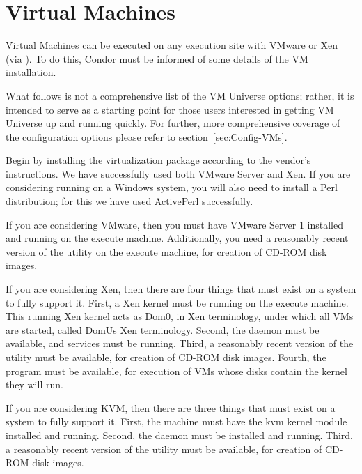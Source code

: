 \section{\label{sec:vm-install}Virtual Machines}


Virtual Machines can be executed on any execution site with VMware or Xen
(via ).  To do this, Condor must be informed of some details 
of the VM installation.

What follows is not a comprehensive list of the VM Universe options; rather,
it is intended to serve as a starting point for those users interested in
getting VM Universe up and running quickly.  For further, more comprehensive 
coverage of the configuration options please refer to 
section~\ref{sec:Config-VMs}.

Begin by installing the virtualization package according to the vendor's
instructions.  We have successfully used both VMware Server and Xen. If you
are considering running on a Windows system, you will also need to install
a Perl distribution; for this we have used ActivePerl successfully. 

If you are considering VMware, then you must have VMware Server 1 installed
and running on the execute machine. Additionally, you need a reasonably
recent version of the  utility on the execute machine, for
creation of CD-ROM disk images.

If you are considering Xen, then there are four things that must exist on 
a system to fully support it. First, a Xen kernel must be running on the 
execute machine. This running Xen kernel acts as Dom0, in Xen terminology, 
under which all VMs are started, called DomUs Xen terminology. Second, 
the  daemon must be available, and  services must be running. 
Third, a reasonably recent version of the  utility must be available, 
for creation of CD-ROM disk images. Fourth, the  program must be 
available, for execution of VMs whose disks contain the kernel they will run.

If you are considering KVM, then there are three things that must exist on a 
system to fully support it.  First, the machine must have the kvm kernel 
module installed and running.  Second, the  daemon must be 
installed and running.  Third, a reasonably recent version of the  
utility must be available, for creation of CD-ROM disk images.

